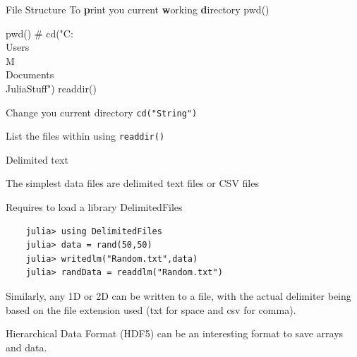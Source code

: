 \documentclass{beamer}
\newenvironment{Boxx}{\begin{tcolorbox}[standard jigsaw, opacityframe=0.8, opacityback=0.0,left=2pt,right=2pt,top=0pt,bottom=0pt]}{\end{tcolorbox}}
\begin{document}
\begin{frame}[fragile]{File Structure}
	To \textbf{p}rint you current \textbf{w}orking \textbf{d}irectory {\color{red} pwd()}

  \begin{Boxx}
  \begin{jllisting}
	pwd()
	# cd("C:\\Users\\M\\Documents\\JuliaStuff")
	readdir()
	\end{jllisting}
  \end{Boxx}
	Change you current directory {\color{red}\verb|cd("String")|} 
	
	List the files within using {\color{red}\verb|readdir()|}
	
\end{frame}


\begin{frame}[fragile]{Delimited text}
	
	The simplest data files are delimited text files or CSV files
	
	Requires to load a library {\color{red}DelimitedFiles}
	\vspace*{0.25cm}
	
	\begin{lstlisting}
	julia> using DelimitedFiles
	julia> data = rand(50,50)
	julia> writedlm("Random.txt",data)
	julia> randData = readdlm("Random.txt")
	\end{lstlisting}
	
\vspace*{0.5cm}
	Similarly, any 1D or 2D can be written to a file, with the actual delimiter being based on the file extension used (txt for space and csv for comma).
	
\pause
\vspace*{0.5cm}
	Hierarchical Data Format (HDF5) can be an interesting format to save arrays and data.
	
\end{frame}
\end{document}
